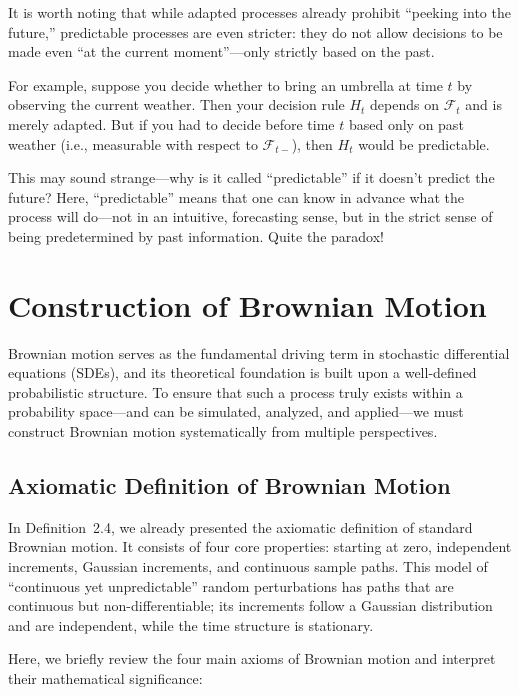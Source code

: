 \documentclass{article}
\begin{document}
It is worth noting that while adapted processes already prohibit “peeking into the future,” predictable processes are even stricter: they do not allow decisions to be made even “at the current moment”—only strictly based on the past. 

For example, suppose you decide whether to bring an umbrella at time $t$ by observing the current weather. Then your decision rule $H_t$ depends on $\mathcal{F}_t$ and is merely adapted. But if you had to decide before time $t$ based only on past weather (i.e., measurable with respect to $\mathcal{F}_{t-}$), then $H_t$ would be predictable.

This may sound strange—why is it called “predictable” if it doesn’t predict the future? Here, “predictable” means that one can know in advance what the process will do—not in an intuitive, forecasting sense, but in the strict sense of being predetermined by past information. Quite the paradox!

\section{Construction of Brownian Motion}

Brownian motion serves as the fundamental driving term in stochastic differential equations (SDEs), and its theoretical foundation is built upon a well-defined probabilistic structure. To ensure that such a process truly exists within a probability space—and can be simulated, analyzed, and applied—we must construct Brownian motion systematically from multiple perspectives.

\subsection{Axiomatic Definition of Brownian Motion}

In Definition~2.4, we already presented the axiomatic definition of standard Brownian motion. It consists of four core properties: starting at zero, independent increments, Gaussian increments, and continuous sample paths. This model of “continuous yet unpredictable” random perturbations has paths that are continuous but non-differentiable; its increments follow a Gaussian distribution and are independent, while the time structure is stationary.

Here, we briefly review the four main axioms of Brownian motion and interpret their mathematical significance:
\end{document}
